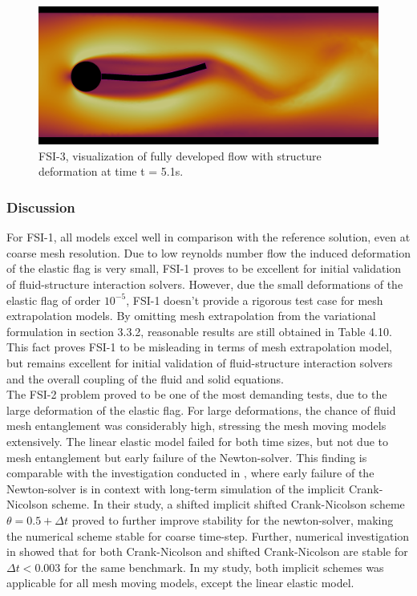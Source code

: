 \begin{figure}[h!]
  \centering
    \includegraphics[scale=0.2]{./Fig/fsi3flow.png}
      \caption{FSI-3, visualization of fully developed flow with structure deformation at time t = 5.1s.}
\end{figure}
\newpage
\subsubsection*{Discussion}
For FSI-1, all models excel well in comparison with the reference solution, even at coarse mesh resolution. Due to low reynolds number flow the induced deformation of the elastic flag is very small, FSI-1 proves to be excellent for initial validation of fluid-structure interaction solvers. However, due the small deformations of the elastic flag of order $10^{-5}$,  FSI-1 doesn't provide a rigorous test case for mesh extrapolation models.  By omitting mesh extrapolation from the variational formulation in section 3.3.2,  reasonable results are still obtained in Table 4.10. This fact proves FSI-1 to be misleading in terms of mesh extrapolation model, but remains excellent for initial validation of fluid-structure interaction solvers and the overall coupling of the fluid and solid equations. \\
The FSI-2 problem proved to be one of the most demanding tests, due to the large deformation of the elastic flag. For large deformations, the chance of fluid mesh entanglement was considerably high, stressing the mesh moving models extensively. The linear elastic model failed for both time sizes, but not due to mesh entanglement but early failure of the Newton-solver. This finding is comparable with the investigation conducted in \cite{Richter2015}, where early failure of the Newton-solver is in context with long-term simulation of the implicit Crank-Nicolson scheme. In their study, a shifted implicit shifted Crank-Nicolson scheme $\theta = 0.5 + \Delta t$ proved to further improve stability for the newton-solver, making the numerical scheme stable for coarse time-step. Further, numerical investigation in \cite{Richter2015} showed that for both Crank-Nicolson and  shifted Crank-Nicolson are stable for $\Delta t < 0.003$ for the same benchmark. In my study, both implicit schemes was applicable for all mesh moving models, except the linear elastic model. \\
